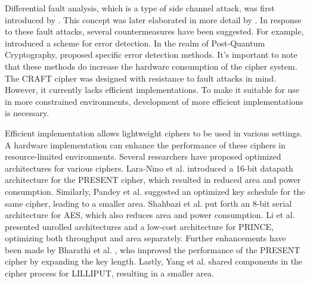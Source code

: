 \documentclass[final,5p,times,twocolumn]{elsarticle}
\begin{document}
Differential fault analysis, which is a type of side channel attack, was first introduced by \cite{Biham1997}. This concept was later elaborated in more detail by \cite{Kermani}. In response to these fault attacks, several countermeasures have been suggested. For example, \cite{Kaur2024} introduced a scheme for error detection. In the realm of Post-Quantum Cryptography, \cite{Canto2023} proposed specific error detection methods. It's important to note that these methods do increase the hardware consumption of the cipher system. The CRAFT cipher was designed with resistance to fault attacks in mind. However, it currently lacks efficient implementations. To make it suitable for use in more constrained environments, development of more efficient implementations is necessary.

Efficient implementation allows lightweight ciphers to be used in various settings.
A hardware implementation can enhance the performance of these ciphers in resource-limited environments.
Several researchers have proposed optimized architectures for various ciphers.
Lara-Nino et al. \cite{LaraNino2017} introduced a 16-bit datapath architecture for the PRESENT cipher, which resulted in reduced area and power consumption.
Similarly, Pandey et al. \cite{Pandey2019} suggested an optimized key schedule for the same cipher, leading to a smaller area.
Shahbazi et al. \cite{Shahbazi2021} put forth an 8-bit serial architecture for AES, which also reduces area and power consumption.
Li et al. \cite{Li2021} presented unrolled architectures and a low-cost architecture for PRINCE, optimizing both throughput and area separately.
Further enhancements have been made by Bharathi et al. \cite{Bharathi2022}, who improved the performance of the PRESENT cipher by expanding the key length.
Lastly, Yang et al. \cite{Yang2023} shared components in the cipher process for LILLIPUT, resulting in a smaller area.
\end{document}
